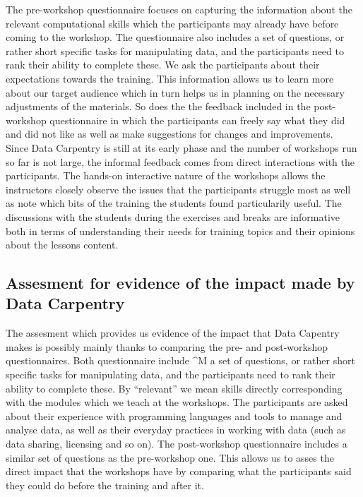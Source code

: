 \documentclass[15]{idcc}
\begin{document}
\begin{itemize}
The pre-workshop questionnaire focuses on capturing the information about the relevant computational skills which the participants may already
have before coming to the workshop. The questionnaire also includes 
a set of questions, or rather short specific tasks for manipulating data, and the participants need to rank their ability to complete these. 
We ask the participants about their expectations towards the training. This information allows us to learn more about our target audience which
in turn helps us in planning on the necessary adjustments of the materials. So does the the feedback included in the post-workshop questionnaire in which the 
participants can freely say what they did and did not like as well as  make suggestions for changes and improvements.\\ 

Since Data Carpentry is still at its early phase and the number of workshops run so far is not large, the informal feedback comes from direct interactions with the participants. 
The hands-on interactive nature of the workshops allows the instructors closely observe the issues that the participants struggle most as well as note which bits of the training the students
found particularily useful. The discussions with the students during the exercises and breaks are informative both in terms of understanding
their needs for training topics and their opinions about the lessons content. 


\subsection{Assesment for evidence of the impact made by Data Carpentry}
The assesment which provides us evidence of the impact that Data Capentry makes is possibly mainly thanks to comparing the pre- and post-workshop questionnaires. 
 Both questionnaire include ^M a set of questions, or rather short specific tasks for manipulating data, and the participants need to rank their ability to complete these.
By ``relevant'' we mean skills directly corresponding with the modules which we teach at the workshops. The 
participants are asked about their experience with programming languages and tools to manage and analyse data, as well as their everyday practices
in working with data (such as data sharing, licensing and so on). The post-workshop questionnaire includes a similar set of questions as the 
pre-workshop one. This allows us to asses the direct impact that the workshops 
have by comparing what the participants said they could do before the training and after it. \\


\end{itemize}
\end{document}
